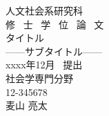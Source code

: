 \begin{titlepage}
\begin{spacing}{2.3}

\begin{center}
\vspace*{80truept}
{\huge 人文社会系研究科}\\
\vspace{30truept}
{\huge 修 \ 士 \ 学 \ 位 \ 論 \ 文}\\
\vspace{30truept}
{\huge タイトル}\\ %
{\LARGE ------サブタイトル------}\\ %
\vspace{100truept}
{\LARGE xxxx年12月 \ 提出}\\ %
{\LARGE 社会学専門分野}\\ %
{\LARGE 12-345678}\\ %
{\LARGE 麦山 亮太}\\ %
\end{center}

\end{spacing}
\end{titlepage}

%
